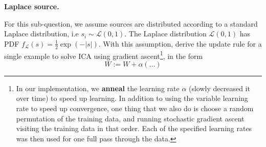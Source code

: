 \item {} \textbf{Laplace source.}

For this sub-question, we assume sources are distributed according to a standard Laplace distribution, i.e $s_i \sim \mathcal{L}(0,1)$. The Laplace distribution $\mathcal{L}(0,1)$ has PDF $f_{\mathcal{L}}(s) = \frac{1}{2}\exp\left(-|s| \right)$. With this assumption, derive the update rule for a single example to solve ICA using gradient ascent\footnote{In our implementation, we {\bf anneal} the learning rate $\alpha$ (slowly decreased it over time) to speed up learning. In addition to using the variable learning rate to speed up convergence, one thing that we also do is choose a random permutation of the training data, and running stochastic
gradient ascent visiting the training data in that order. Each of the specified learning rates was then used for one full pass through the data.}, in the form
$$ W := W + \alpha \left(\ldots\right)$$ 
